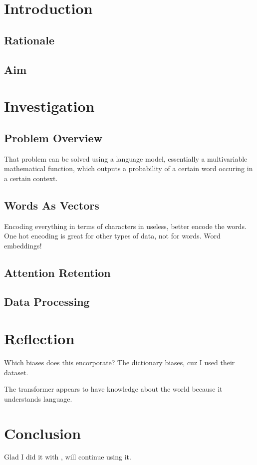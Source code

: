 \documentclass{article}
\begin{document}
\begin{multicols}{2}
\section{Introduction}
\subsection{Rationale}
\lipsum[1-6]
\subsection{Aim}
\lipsum[1-6]
\section{Investigation}
\subsection{Problem Overview}
That problem can be solved using a language model, essentially a multivariable mathematical function, which outputs a probability of a certain word occuring in a certain context.
\lipsum[1-6]
\subsection{Words As Vectors}
Encoding everything in terms of characters in useless, better encode the words.
One hot encoding is great for other types of data, not for words. Word embeddings\cite{robmiles-embeddings}!
\subsection{Attention Retention}
\lipsum[1-6]
\subsection{Data Processing}
\lipsum[1-6]
\section{Reflection}
Which biases does this encorporate? The dictionary biases, cuz I used their dataset.

The transformer appears to have knowledge about the world because it understands language.

\lipsum[2]
\section{Conclusion}
Glad I did it with \LaTeXe\cite{latex2e}, will continue using it.
\end{multicols}

\clearpage


\end{document}
